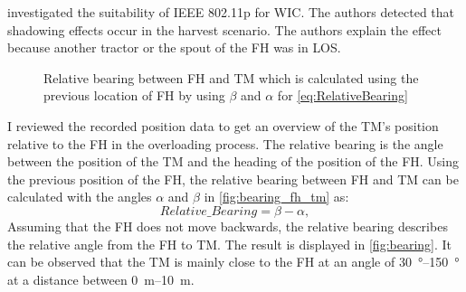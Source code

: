 \textcite{klingler_agriculture_2018} investigated the suitability of IEEE 802.11p for \ac{WIC}.
The authors detected that shadowing effects occur in the harvest scenario.
The authors explain the effect because another tractor or the spout of the \ac{FH} was in \ac{LOS}.
\begin{figure}%
   \centering
   \caption{Relative bearing between \ac{FH} and \ac{TM} which is calculated using the previous location of \ac{FH} by using $\beta$ and $\alpha$ for \autoref{eq:RelativeBearing}}%
   \label{fig:bearing_fh_tm}%
\end{figure}
I reviewed the recorded position data to get an overview of the \ac{TM}'s position relative to the \ac{FH} in the overloading process. The relative bearing is the angle between the position of the \ac{TM} and the heading of the position of the \ac{FH}. Using the previous position of the \ac{FH}, the relative bearing between \ac{FH} and \ac{TM} can be calculated with the angles $\alpha$ and $\beta$ in \autoref{fig:bearing_fh_tm} as:
\begin{equation}\label{eq:RelativeBearing}
   Relative\_Bearing = \beta - \alpha ,
\end{equation}
Assuming that the \ac{FH} does not move backwards, the relative bearing describes the relative angle from the
\ac{FH} to \ac{TM}.
The result is displayed in \autoref{fig:bearing}.
It can be observed that the \ac{TM} is mainly close to the \ac{FH} at an angle of \SIrange{30}{150}{\degree} at
a distance between \SIrange{0}{10}{\metre}.

